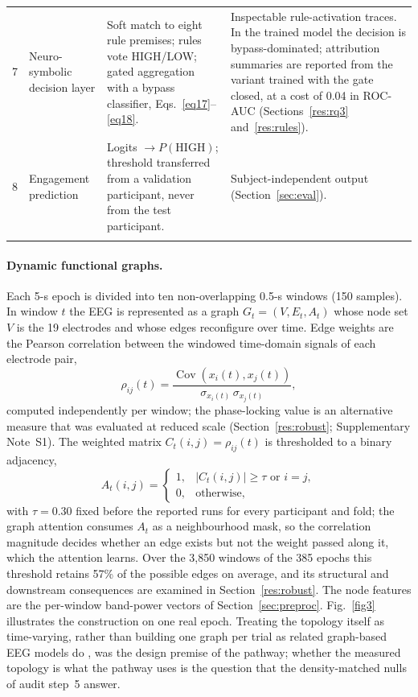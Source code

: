 \documentclass[pdflatex,sn-basic,Numbered,twocolumn,iicol]{sn-jnl}
\theoremstyle{thmstyleone}%
\theoremstyle{thmstyletwo}%
\theoremstyle{thmstylethree}%
\begin{document}
\begin{table}[!htbp]
\begin{tabular}{@{}p{0.3cm}p{2.9cm}p{5.2cm}p{5.2cm}@{}}
7 & Neuro-symbolic decision layer & Soft match to eight rule premises; rules vote HIGH/LOW; gated aggregation with a bypass classifier, Eqs.~\eqref{eq17}--\eqref{eq18}. & Inspectable rule-activation traces. In the trained model the decision is bypass-dominated; attribution summaries are reported from the variant trained with the gate closed, at a cost of 0.04 in ROC-AUC (Sections~\ref{res:rq3} and~\ref{res:rules}). \\
8 & Engagement prediction & Logits $\rightarrow P(\mathrm{HIGH})$; threshold transferred from a validation participant, never from the test participant. & Subject-independent output (Section~\ref{sec:eval}). \\
\botrule
\end{tabular}
\end{table}

\paragraph{Dynamic functional graphs.} Each 5-s epoch is divided into ten non-overlapping 0.5-s windows (150 samples). In window $t$ the EEG is represented as a graph $G_t=(V,E_t,A_t)$ whose node set $V$ is the 19 electrodes and whose edges reconfigure over time. Edge weights are the Pearson correlation between the windowed time-domain signals of each electrode pair,
\begin{equation}
\rho_{ij}(t) = \frac{\operatorname{Cov}\!\left(x_i(t), x_j(t)\right)}{\sigma_{x_i(t)}\,\sigma_{x_j(t)}}, \label{eq2pearson}
\end{equation}
computed independently per window; the phase-locking value is an alternative measure that was evaluated at reduced scale (Section~\ref{res:robust}; Supplementary Note~S1). The weighted matrix $C_t(i,j)=\rho_{ij}(t)$ is thresholded to a binary adjacency,
\begin{equation}
A_t(i,j) = \begin{cases} 1, & |C_t(i,j)| \geq \tau \text{ or } i=j, \\ 0, & \text{otherwise}, \end{cases} \label{eq3}
\end{equation}
with $\tau=0.30$ fixed before the reported runs for every participant and fold; the graph attention consumes $A_t$ as a neighbourhood mask, so the correlation magnitude decides whether an edge exists but not the weight passed along it, which the attention learns. Over the 3{,}850 windows of the 385 epochs this threshold retains 57\% of the possible edges on average, and its structural and downstream consequences are examined in Section~\ref{res:robust}. The node features are the per-window band-power vectors of Section~\ref{sec:preproc}. Fig.~\ref{fig3} illustrates the construction on one real epoch. Treating the topology itself as time-varying, rather than building one graph per trial as related graph-based EEG models do \cite{ref19,ref20,ref21,ref22}, was the design premise of the pathway; whether the measured topology is what the pathway uses is the question that the density-matched nulls of audit step~5 answer.
\end{document}
